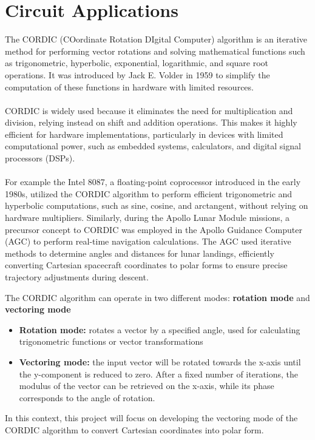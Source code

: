 \section{Circuit Applications}
The CORDIC (COordinate Rotation DIgital Computer) algorithm is an iterative method for performing vector rotations and 
solving mathematical functions such as trigonometric, hyperbolic, exponential, logarithmic, and square root operations. 
It was introduced by Jack E. Volder in 1959 to simplify the computation of these functions in hardware with limited resources.
\\\\
CORDIC is widely used because it eliminates the need for multiplication and division, relying instead on shift and addition operations. 
This makes it highly efficient for hardware implementations, particularly in devices with limited computational power, 
such as embedded systems, calculators, and digital signal processors (DSPs).
\\\\
For example the Intel 8087, a floating-point coprocessor introduced in the early 1980s, utilized the CORDIC algorithm to perform 
efficient trigonometric and hyperbolic computations, such as sine, cosine, and arctangent, without relying on hardware multipliers.
Similarly, during the Apollo Lunar Module missions, a precursor concept to CORDIC was employed in the Apollo Guidance Computer (AGC) 
to perform real-time navigation calculations. The AGC used iterative methods to determine angles and distances for lunar landings, 
efficiently converting Cartesian spacecraft coordinates to polar forms to ensure precise trajectory adjustments during descent.

The CORDIC algorithm can operate in two different modes: \textbf{rotation mode} and \textbf{vectoring mode}
\begin{itemize}
    \item \textbf{Rotation mode:} rotates a vector by a specified angle, used for calculating trigonometric functions or vector transformations
    \item \textbf{Vectoring mode:} the input vector will be rotated towards the x-axis until the y-component is reduced to zero. After a fixed number of iterations, the modulus of the vector can be retrieved on the x-axis, while its phase corresponds to the angle of rotation.
\end{itemize}
In this context, this project will focus on developing the vectoring mode of the CORDIC algorithm to convert Cartesian coordinates into polar form.